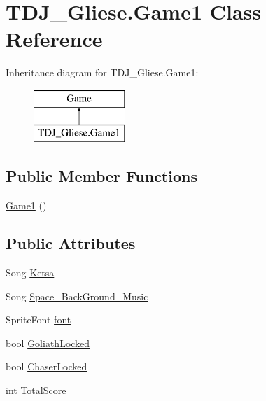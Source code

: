 \hypertarget{class_t_d_j___gliese_1_1_game1}{}\section{T\+D\+J\+\_\+\+Gliese.\+Game1 Class Reference}
\label{class_t_d_j___gliese_1_1_game1}
Inheritance diagram for T\+D\+J\+\_\+\+Gliese.\+Game1\+:\begin{figure}[H]
\begin{center}
\leavevmode
\includegraphics[height=2.000000cm]{class_t_d_j___gliese_1_1_game1}
\end{center}
\end{figure}
\subsection*{Public Member Functions}
\begin{DoxyCompactItemize}
\item 
\hyperlink{class_t_d_j___gliese_1_1_game1_a4ab3d1367aa2bfebb3e81b1d05925cf8}{Game1} ()
\end{DoxyCompactItemize}
\subsection*{Public Attributes}
\begin{DoxyCompactItemize}
\item 
Song \hyperlink{class_t_d_j___gliese_1_1_game1_a62bb1950bf4cc765eabacbe64f80e7ad}{Ketsa}
\item 
Song \hyperlink{class_t_d_j___gliese_1_1_game1_aeeace33dbcd3354a01167dca9e2e7528}{Space\+\_\+\+Back\+Ground\+\_\+\+Music}
\item 
Sprite\+Font \hyperlink{class_t_d_j___gliese_1_1_game1_a382070185267a3730591497cfa98ac96}{font}
\item 
bool \hyperlink{class_t_d_j___gliese_1_1_game1_a9876fddfa3914cd316606efc8638203f}{Goliath\+Locked}
\item 
bool \hyperlink{class_t_d_j___gliese_1_1_game1_ad71bd8c5662aa5e6bee1ecb3b1dc3d7d}{Chaser\+Locked}
\item 
int \hyperlink{class_t_d_j___gliese_1_1_game1_a734bacaf4213efa2a5f597ba23cf6626}{Total\+Score}
\end{DoxyCompactItemize}
